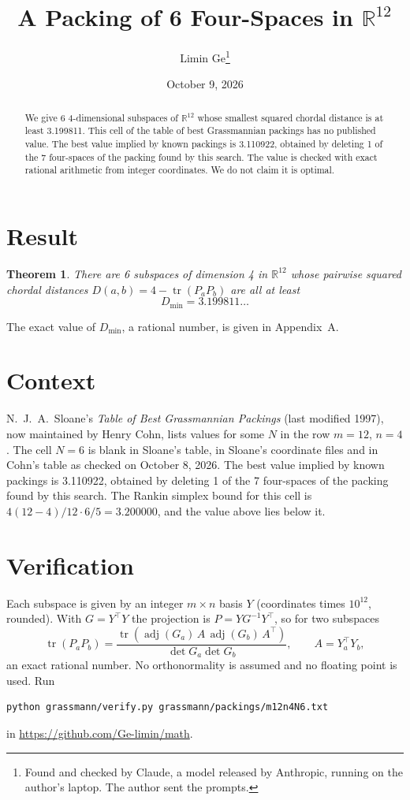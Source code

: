 \documentclass[11pt,a4paper]{article}
\title{A Packing of 6 Four-Spaces in $\mathbb{R}^{12}$}
\author{Limin Ge\thanks{Found and checked by Claude, a model released by Anthropic, running on the author's laptop. The author sent the prompts.}}
\date{October 9, 2026}
\newtheorem*{theorem}{Theorem}
\begin{document}
\maketitle
\begin{abstract}
We give 6 4-dimensional subspaces of $\mathbb{R}^{12}$ whose smallest squared chordal distance is at least 3.199811. This cell of the table of best Grassmannian packings has no published value. The best value implied by known packings is 3.110922, obtained by deleting 1 of the 7 four-spaces of the packing found by this search. The value is checked with exact rational arithmetic from integer coordinates. We do not claim it is optimal.
\end{abstract}

\section{Result}
\begin{theorem}
There are 6 subspaces of dimension 4 in $\mathbb{R}^{12}$ whose pairwise squared chordal distances $D(a,b) = 4 - \operatorname{tr}(P_aP_b)$ are all at least
\[ D_{\min} = 3.199811\ldots \]
\end{theorem}
The exact value of $D_{\min}$, a rational number, is given in Appendix~A.


\section{Context}
N.~J.~A.~Sloane's \emph{Table of Best Grassmannian Packings} (last modified 1997), now maintained by Henry Cohn, lists values for some $N$ in the row $m=12$, $n=4$. The cell $N=6$ is blank in Sloane's table, in Sloane's coordinate files and in Cohn's table as checked on October 8, 2026. The best value implied by known packings is 3.110922, obtained by deleting 1 of the 7 four-spaces of the packing found by this search. The Rankin simplex bound for this cell is $4(12-4)/12\cdot 6/5 = 3.200000$, and the value above lies below it.


\section{Verification}
Each subspace is given by an integer $m\times n$ basis $Y$ (coordinates times $10^{12}$, rounded). With $G=Y^\top Y$ the projection is $P=YG^{-1}Y^\top$, so for two subspaces
\[ \operatorname{tr}(P_aP_b)=\frac{\operatorname{tr}(\operatorname{adj}(G_a)\,A\,\operatorname{adj}(G_b)\,A^\top)}{\det G_a\det G_b},\qquad A=Y_a^\top Y_b, \]
an exact rational number. No orthonormality is assumed and no floating point is used. Run
\begin{verbatim}
python grassmann/verify.py grassmann/packings/m12n4N6.txt
\end{verbatim}
in \url{https://github.com/Ge-limin/math}.
\end{document}

